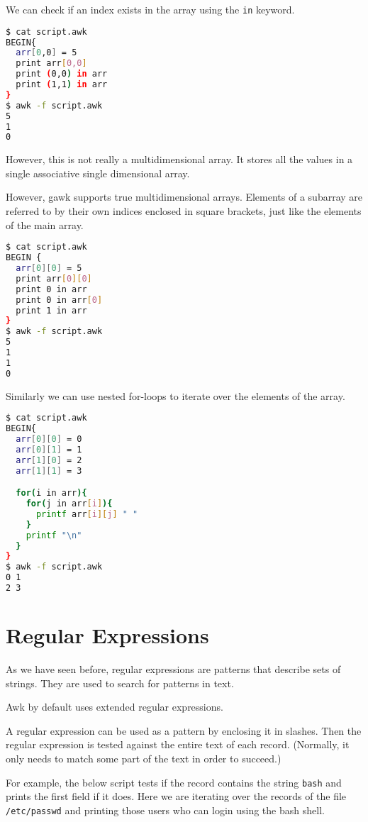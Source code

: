 We can check if an index exists in the array using the \lstinline|in| keyword.

\begin{lstlisting}[language=bash]
$ cat script.awk
BEGIN{
  arr[0,0] = 5
  print arr[0,0]
  print (0,0) in arr
  print (1,1) in arr
}
$ awk -f script.awk
5
1
0
\end{lstlisting}

However, this is not really a multidimensional array. It stores all the values in a single associative single dimensional array.

However, gawk supports true multidimensional arrays.
Elements of a subarray are referred to by their own indices enclosed in square brackets, just like the elements of the main array.

\begin{lstlisting}[language=bash]
$ cat script.awk
BEGIN {
  arr[0][0] = 5
  print arr[0][0]
  print 0 in arr
  print 0 in arr[0]
  print 1 in arr
}
$ awk -f script.awk
5
1
1
0
\end{lstlisting}

Similarly we can use nested for-loops to iterate over the elements of the array.

\begin{lstlisting}[language=bash]
$ cat script.awk
BEGIN{
  arr[0][0] = 0
  arr[0][1] = 1
  arr[1][0] = 2
  arr[1][1] = 3

  for(i in arr){
    for(j in arr[i]){
      printf arr[i][j] " "
    }
    printf "\n"
  }
}
$ awk -f script.awk
0 1
2 3
\end{lstlisting}

\section{Regular Expressions}

As we have seen before, regular expressions are patterns that describe sets of strings. They are used to search for patterns in text.

Awk by default uses extended regular expressions.

A regular expression can be used as a pattern by enclosing it in slashes. Then the regular expression is tested against the entire text of each record. (Normally, it only needs to match some part of the text in order to succeed.)

For example, the below script tests if the record contains the string \lstinline|bash| and prints the first field if it does.
Here we are iterating over the records of the file \lstinline|/etc/passwd| and printing those users who can login using the bash shell.


